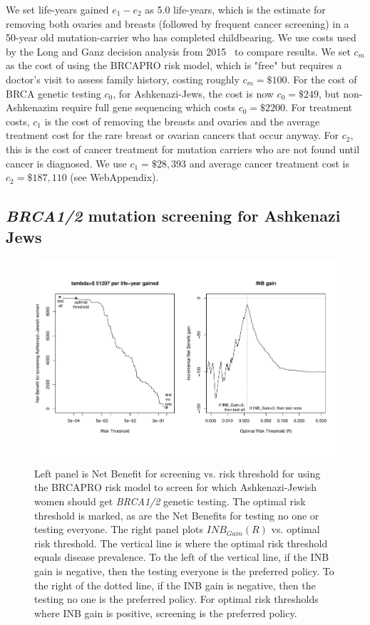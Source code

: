 \documentclass[AMA,STIX1COL]{WileyNJD-v2}
\begin{document}
We set life-years gained $e_1-e_2$ as 5.0 life-years, which is the estimate for removing both ovaries and breasts (followed by frequent cancer screening) in a 50-year old mutation-carrier who has completed childbearing\cite{Sigal2012}.  We use costs used by the Long and Ganz decision analysis from 2015~\citep{Long2015} to compare results.  We set $c_m$ as the cost of using the BRCAPRO risk model, which is "free" but requires a doctor's visit to assess family history, costing roughly $c_m=\$100$.  For the cost of BRCA genetic testing $c_0$,  for Ashkenazi-Jews, the cost is now $c_0=\$249$, but non-Ashkenazim require full gene sequencing which costs $c_0=\$2200$.   For treatment costs, $c_1$ is the cost of removing the breasts and ovaries and the average treatment cost for the rare breast or ovarian cancers that occur anyway.  For $c_2$, this is the cost of cancer treatment for mutation carriers who are not found until cancer is diagnosed.  We use $c_1=\$28,393$ and average cancer treatment cost is $c_2=\$187,110$ (see WebAppendix).  

\subsection{\textit{BRCA1/2} mutation screening for Ashkenazi Jews}
\label{sec:BRCAAJs}

\begin{figure}[t!]
	\centering
	\includegraphics[angle=-0,width=5.5in,]{Fig1AJ.pdf}
	\caption{Left panel is Net Benefit for screening vs. risk threshold for using the BRCAPRO risk model to screen for which Ashkenazi-Jewish women should get \textit{BRCA1/2} genetic testing.  The optimal risk threshold is marked, as are the Net Benefits for testing no one or testing everyone.  The right panel plots $I\!N\!B_{Gain}(R)$ vs. optimal risk threshold.  The vertical line is where the optimal risk threshold equals disease prevalence.  To the left of the vertical line, if the INB gain is negative, then the testing everyone is the preferred policy.  To the right of the dotted line, if the INB gain is negative, then the testing no one is the preferred policy.  For optimal risk thresholds where INB gain is positive, screening is the preferred policy.}
	\label{fig:1AJ}
\end{figure}
\end{document}
